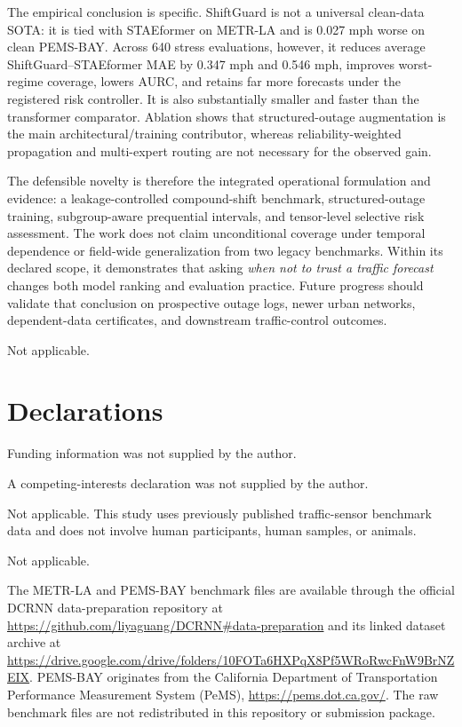 \documentclass[pdflatex,sn-mathphys-num]{sn-jnl}
\begin{document}
The empirical conclusion is specific. ShiftGuard is not a universal clean-data
SOTA: it is tied with STAEformer on METR-LA and is 0.027 mph worse on clean
PEMS-BAY. Across 640 stress evaluations, however, it reduces average
ShiftGuard--STAEformer MAE by 0.347 mph and 0.546 mph, improves worst-regime
coverage, lowers AURC, and retains far more forecasts under the registered risk
controller. It is also substantially smaller and faster than the transformer
comparator. Ablation shows that structured-outage augmentation is the main
architectural/training contributor, whereas reliability-weighted propagation
and multi-expert routing are not necessary for the observed gain.

The defensible novelty is therefore the integrated operational formulation and
evidence: a leakage-controlled compound-shift benchmark, structured-outage
training, subgroup-aware prequential intervals, and tensor-level selective risk
assessment. The work does not claim unconditional coverage under temporal
dependence or field-wide generalization from two legacy benchmarks. Within its
declared scope, it demonstrates that asking \emph{when not to trust a traffic
forecast} changes both model ranking and evaluation practice. Future progress
should validate that conclusion on prospective outage logs, newer urban
networks, dependent-data certificates, and downstream traffic-control outcomes.

\backmatter

Not applicable.

\section*{Declarations}

Funding information was not supplied by the author.

A competing-interests declaration was not supplied by the author.

Not applicable. This study uses previously published traffic-sensor benchmark data and does not involve human participants, human samples, or animals.

Not applicable.

The METR-LA and PEMS-BAY benchmark files are available through the official DCRNN data-preparation repository at \url{https://github.com/liyaguang/DCRNN#data-preparation} and its linked dataset archive at \url{https://drive.google.com/drive/folders/10FOTa6HXPqX8Pf5WRoRwcFnW9BrNZEIX}. PEMS-BAY originates from the California Department of Transportation Performance Measurement System (PeMS), \url{https://pems.dot.ca.gov/}. The raw benchmark files are not redistributed in this repository or submission package.
\end{document}
